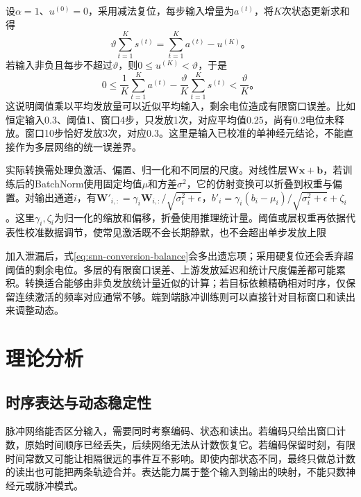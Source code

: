 设$\alpha=1$、$u^{(0)}=0$，采用减法复位，每步输入增量为$a^{(t)}$，将$K$次状态更新求和得
\begin{equation}
  \vartheta\sum_{t=1}^{K}s^{(t)}
  =\sum_{t=1}^{K}a^{(t)}-u^{(K)}\text{。}
  \label{eq:snn-conversion-balance}
\end{equation}
若输入非负且每步不超过$\vartheta$，则$0\leq u^{(K)}<\vartheta$，于是
\begin{equation}
  0\leq\frac1K\sum_{t=1}^{K}a^{(t)}
       -\frac{\vartheta}{K}\sum_{t=1}^{K}s^{(t)}
  <\frac{\vartheta}{K}\text{。}
  \label{eq:snn-conversion-error}
\end{equation}
这说明阈值乘以平均发放量可以近似平均输入，剩余电位造成有限窗口误差。比如恒定输入0.3、阈值1、窗口4步，只发放1次，对应平均值0.25，尚有0.2电位未释放。窗口10步恰好发放3次，对应0.3。这里是输入已校准的单神经元结论，不能直接作为多层网络的统一误差界。

实际转换需处理负激活、偏置、归一化和不同层的尺度。对线性层$\bm W\bm x+\bm b$，若训练后的BatchNorm使用固定均值$\mu$和方差$\sigma^2$，它的仿射变换可以折叠到权重与偏置。对输出通道$i$，有$\bm W'_{i,:}=\gamma_i\bm W_{i,:}/\sqrt{\sigma_i^2+\epsilon}$，$b'_i=\gamma_i(b_i-\mu_i)/\sqrt{\sigma_i^2+\epsilon}+\zeta_i$。这里$\gamma_i,\zeta_i$为归一化的缩放和偏移，折叠使用推理统计量。阈值或层权重再依据代表性校准数据调节，使常见激活既不会长期静默，也不会超出单步发放上限

加入泄漏后，式\eqref{eq:snn-conversion-balance}会多出遗忘项；采用硬复位还会丢弃超阈值的剩余电位。多层的有限窗口误差、上游发放延迟和统计尺度偏差都可能累积。转换适合能够由非负发放统计量近似的计算；若目标依赖精确相对时序，仅保留连续激活的频率对应通常不够。端到端脉冲训练则可以直接针对目标窗口和读出来调整动态。

\section{理论分析}
\label{sec:snn-analysis}

\subsection{时序表达与动态稳定性}
\label{sec:snn-temporal-stability}

脉冲网络能否区分输入，需要同时考察编码、状态和读出。若编码只给出窗口计数，原始时间顺序已经丢失，后续网络无法从计数恢复它。若编码保留时刻，有限时间常数又可能让相隔很远的事件互不影响。即使内部状态不同，最终只做总计数的读出也可能把两条轨迹合并。表达能力属于整个输入到输出的映射，不能只数神经元或脉冲模式。

